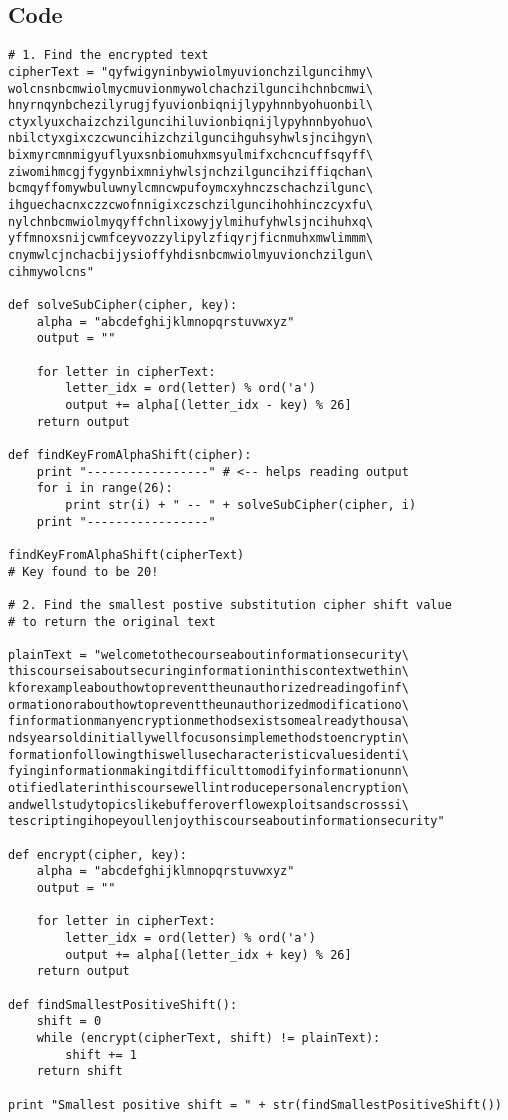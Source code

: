 \documentclass[a4paper]{article}
\begin{document}
\subsection{Code}
\begin{lstlisting} 
# 1. Find the encrypted text
cipherText = "qyfwigyninbywiolmyuvionchzilguncihmy\
wolcnsnbcmwiolmycmuvionmywolchachzilguncihchnbcmwi\
hnyrnqynbchezilyrugjfyuvionbiqnijlypyhnnbyohuonbil\
ctyxlyuxchaizchzilguncihiluvionbiqnijlypyhnnbyohuo\
nbilctyxgixczcwuncihizchzilguncihguhsyhwlsjncihgyn\
bixmyrcmnmigyuflyuxsnbiomuhxmsyulmifxchcncuffsqyff\
ziwomihmcgjfygynbixmniyhwlsjnchzilguncihziffiqchan\
bcmqyffomywbuluwnylcmncwpufoymcxyhnczschachzilgunc\
ihguechacnxczzcwofnnigixczschzilguncihohhinczcyxfu\
nylchnbcmwiolmyqyffchnlixowyjylmihufyhwlsjncihuhxq\
yffmnoxsnijcwmfceyvozzylipylzfiqyrjficnmuhxmwlimmm\
cnymwlcjnchacbijysioffyhdisnbcmwiolmyuvionchzilgun\
cihmywolcns"

def solveSubCipher(cipher, key):
	alpha = "abcdefghijklmnopqrstuvwxyz"
	output = ""

	for letter in cipherText:
		letter_idx = ord(letter) % ord('a')
		output += alpha[(letter_idx - key) % 26]
	return output

def findKeyFromAlphaShift(cipher):
	print "-----------------" # <-- helps reading output
	for i in range(26):
		print str(i) + " -- " + solveSubCipher(cipher, i)
	print "-----------------"

findKeyFromAlphaShift(cipherText)
# Key found to be 20!

# 2. Find the smallest postive substitution cipher shift value
# to return the original text 

plainText = "welcometothecourseaboutinformationsecurity\
thiscourseisaboutsecuringinformationinthiscontextwethin\
kforexampleabouthowtopreventtheunauthorizedreadingofinf\
ormationorabouthowtopreventtheunauthorizedmodificationo\
finformationmanyencryptionmethodsexistsomealreadythousa\
ndsyearsoldinitiallywellfocusonsimplemethodstoencryptin\
formationfollowingthiswellusecharacteristicvaluesidenti\
fyinginformationmakingitdifficulttomodifyinformationunn\
otifiedlaterinthiscoursewellintroducepersonalencryption\
andwellstudytopicslikebufferoverflowexploitsandscrosssi\
tescriptingihopeyoullenjoythiscourseaboutinformationsecurity"

def encrypt(cipher, key):
	alpha = "abcdefghijklmnopqrstuvwxyz"
	output = ""

	for letter in cipherText:
		letter_idx = ord(letter) % ord('a')
		output += alpha[(letter_idx + key) % 26]
	return output

def findSmallestPositiveShift():
	shift = 0
	while (encrypt(cipherText, shift) != plainText):
		shift += 1
	return shift

print "Smallest positive shift = " + str(findSmallestPositiveShift())
\end{lstlisting}
\end{document}
